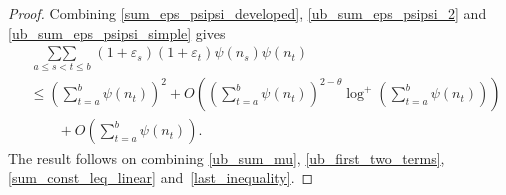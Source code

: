 \documentclass[12pt, reqno]{amsart}
\theoremstyle{definition}
\theoremstyle{remark}
\numberwithin{equation}{section}
\def\leq{\leqslant}
\begin{document}
\begin{proof}
Combining  \eqref{sum_eps_psipsi_developed},
\eqref{ub_sum_eps_psipsi_2} and \eqref{ub_sum_eps_psipsi_simple} gives
\begin{equation}
\begin{aligned} \label{last_inequality}
	&\mathop{\sum\sum}\limits_{a\leq s<t\leq b}  (1+\varepsilon_s)(1+\varepsilon_t)\psi(n_s)\psi(n_t) \\ 
	&\leq  \left( \sum_{t=a}^{b}\psi(n_t)\right)^2 
	+  O\left(\left(\sum_{t=a}^b\psi(n_t) \right)^{2-\theta}\log^+ \left(\sum_{t=a}^b\psi(n_t) \right)\right)
	\\ &\qquad + O\left( 
	\sum_{t=a}^b \psi(n_t)
	\right).
\end{aligned}
\end{equation}
The result follows on combining
\eqref{ub_sum_mu}, \eqref{ub_first_two_terms}, \eqref{sum_const_leq_linear} and~\eqref{last_inequality}.
\end{proof}

\bigskip
\end{document}
